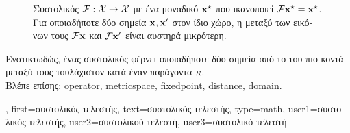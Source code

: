 {{\begin{figure}[H]
    		{
		\caption{\foreignlanguage{greek}{Συστολικός}  $\mathcal{F}:\mathcal{X}\to\mathcal{X}$ 
      			\foreignlanguage{greek}{με ένα μοναδικό}  ${\bf x}^\star$ 
			\foreignlanguage{greek}{που ικανοποιεί $\mathcal{F} {\bf x}^\star={\bf x}^\star$.
      			Για οποιαδήποτε δύο σημεία ${\bf x},{\bf x}'$ στον ίδιο χώρο, η}  \foreignlanguage{greek}{μεταξύ 
			των εικόνων τους $\mathcal{F}{\bf x}$ και $\mathcal{F}{\bf x}'$ είναι αυστηρά μικρότερη}.}
    			\label{fig:contract_dict} }
		\end{figure}
		\foreignlanguage{greek}{Ενστικτωδώς, ένας συστολικός}  \foreignlanguage{greek}{φέρνει 
		οποιαδήποτε δύο σημεία από το}  \foreignlanguage{greek}{του πιο κοντά μεταξύ τους τουλάχιστον 
		κατά έναν παράγοντα} $\kappa$.
		\\ 
		\foreignlanguage{greek}{Βλέπε επίσης:} \gls{operator}, \gls{metricspace}, \gls{fixedpoint}, \gls{distance}, \gls{domain}. },
	first={\foreignlanguage{greek}{συστολικός τελεστής}},
	text={\foreignlanguage{greek}{συστολικός τελεστής}}, 
	type=math,
	user1={\foreignlanguage{greek}{συστολικός τελεστής}}, %
	user2={\foreignlanguage{greek}{συστολικού τελεστή}}, %
	user3={\foreignlanguage{greek}{συστολικό τελεστή}} %
}%

